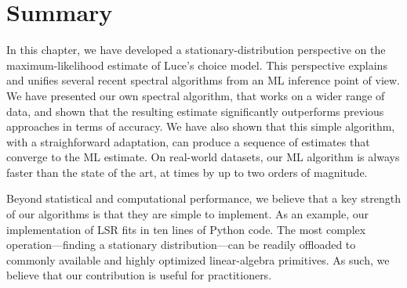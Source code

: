 \section{Summary}
\label{fi:sec:summary}

In this chapter, we have developed a stationary-distribution perspective on the maximum-likelihood estimate of Luce's choice model.
This perspective explains and unifies several recent spectral algorithms from an ML inference point of view.
We have presented our own spectral algorithm, that works on a wider range of data, and shown that the resulting estimate significantly outperforms previous approaches in terms of accuracy.
We have also shown that this simple algorithm, with a straighforward adaptation, can produce a sequence of estimates that converge to the ML estimate.
On real-world datasets, our ML algorithm is always faster than the state of the art, at times by up to two orders of magnitude.

Beyond statistical and computational performance, we believe that a key strength of our algorithms is that they are simple to implement.
As an example, our implementation of LSR fits in ten lines of Python code.
The most complex operation---finding a stationary distribution---can be readily offloaded to commonly available and highly optimized linear-algebra primitives.
As such, we believe that our contribution is useful for practitioners.

